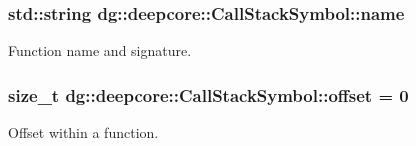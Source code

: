 \subsubsection[{\texorpdfstring{name}{name}}]{\setlength{\rightskip}{0pt plus 5cm}std\+::string dg\+::deepcore\+::\+Call\+Stack\+Symbol\+::name}\hypertarget{structdg_1_1deepcore_1_1_call_stack_symbol_a6792f8a2df6115a99a1d4fd44c6fafff}{}\label{structdg_1_1deepcore_1_1_call_stack_symbol_a6792f8a2df6115a99a1d4fd44c6fafff}


Function name and signature. 

\subsubsection[{\texorpdfstring{offset}{offset}}]{\setlength{\rightskip}{0pt plus 5cm}size\+\_\+t dg\+::deepcore\+::\+Call\+Stack\+Symbol\+::offset = 0}\hypertarget{structdg_1_1deepcore_1_1_call_stack_symbol_a47e23cb3fa667d087a9630017cc478ce}{}\label{structdg_1_1deepcore_1_1_call_stack_symbol_a47e23cb3fa667d087a9630017cc478ce}


Offset within a function. 


